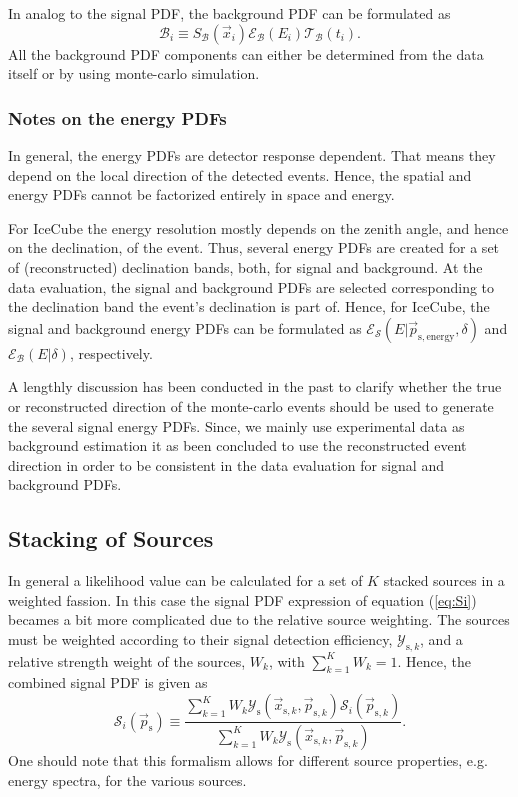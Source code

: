 \documentclass{article}
\newcommand{\ps}{\vec{p}_{\mathrm{s}}}
\newcommand{\psk}{\vec{p}_{\mathrm{s},k}}
\newcommand{\xsk}{\vec{x}_{\mathrm{s},k}}
\begin{document}
In analog to the signal PDF, the background PDF can be formulated as
\begin{equation}
 \mathcal{B}_i \equiv S_{\mathcal{B}}(\vec{x}_i) \mathcal{E}_{\mathcal{B}}(E_i) \mathcal{T}_{\mathcal{B}}(t_i).
 \label{eq:Bi}
\end{equation}
All the background PDF components can either be determined from the data itself
or by using monte-carlo simulation.

\subsubsection{Notes on the energy PDFs}

In general, the energy PDFs are detector response dependent. That means they
depend on the local direction of the detected events. Hence, the spatial and
energy PDFs cannot be factorized entirely in space and energy.

For IceCube the energy resolution mostly depends on the zenith angle, and hence
on the declination, of the event. Thus, several energy PDFs are created for a
set of (reconstructed) declination bands, both, for signal and background. At
the data evaluation, the signal and background PDFs are selected corresponding
to the declination band the event's declination is part of. Hence, for IceCube,
the signal and background energy PDFs can be formulated as
$\mathcal{E}_{\mathcal{S}}(E|\vec{p}_{\mathrm{s,energy}},\delta)$ and
$\mathcal{E}_{\mathcal{B}}(E|\delta)$, respectively.

A lengthly discussion has been conducted in the past to clarify whether the true or
reconstructed direction of the monte-carlo events should be used to generate
the several signal energy PDFs. Since, we mainly use experimental data as
background estimation it as been concluded to use the reconstructed event
direction in order to be consistent in the data evaluation for signal and
background PDFs.

\subsection{Stacking of Sources}

In general a likelihood value can be calculated for a set of $K$ stacked
sources in a weighted fassion. In this case the signal PDF expression of
equation (\ref{eq:Si}) becames a bit more complicated due to the relative
source weighting. The sources must be weighted according to their signal detection
efficiency, $\mathcal{Y}_{\mathrm{s},k}$, and a relative strength weight of the
sources, $W_k$, with $\sum_{k=1}^{K} W_k = 1$. Hence, the combined signal PDF is
given as
\begin{equation}
 \mathcal{S}_i(\ps) \equiv \frac{\sum_{k=1}^{K} W_k \mathcal{Y}_{\mathrm{s}}(\xsk,\psk) \mathcal{S}_{i}(\psk)}{\sum_{k=1}^{K}W_k\mathcal{Y}_{\mathrm{s}}(\xsk,\psk)}.
 \label{eq:SiStacking}
\end{equation}
One should note that this formalism allows for different source properties, e.g.
energy spectra, for the various sources.
\end{document}
